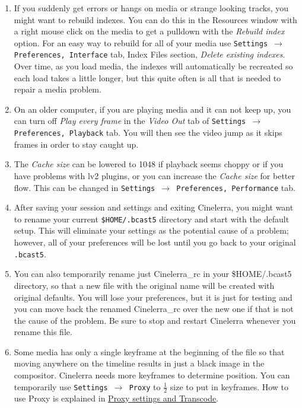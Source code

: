 \begin{enumerate}
	\item If you suddenly get errors or hangs on media or strange looking tracks, you might want to rebuild indexes. You can do this in the Resources window with a right mouse click on the media to get a pulldown with the \textit{Rebuild index} option. For an easy way to rebuild for all of your media use \texttt{Settings $\rightarrow$ Preferences, Interface} tab, Index Files section, \textit{Delete existing indexes}. Over time, as you
load media, the indexes will automatically be recreated so each load takes a little longer, but this quite often
is all that is needed to repair a media problem.
	\item On an older computer, if you are playing media and it can not keep up, you can turn off \textit{Play every frame} in the \textit{Video Out} tab of \texttt{Settings $\rightarrow$ Preferences, Playback} tab. You will then see the video jump as it skips frames in order to stay caught up.
	\item The \textit{Cache size} can be lowered to 1048 if playback seems choppy or if you have problems with lv2 plugins, or you can increase the \textit{Cache size} for better flow. This can be changed in \texttt{Settings $\rightarrow$ Preferences, Performance} tab.
	\item After saving your session and settings and exiting Cinelerra, you might want to rename your current \texttt{\$HOME/.bcast5} directory and start with the default setup. This will eliminate your settings as the potential cause of a problem; however, all of your preferences will be lost until you go back to your original \texttt{.bcast5}.
        \item You can also temporarily rename just Cinelerra\_rc in your \$HOME/.bcast5 directory, so
that a new file with the original name will be created with original defaults.  You will lose your preferences,
but it is just for testing and you can move back the renamed Cinelerra\_rc over the new one if that is not the
cause of the problem.  Be sure to stop and restart Cinelerra whenever you rename this file.
	\item Some media has only a single keyframe at the beginning of the file so that moving anywhere on the timeline results in just a black image in the compositor. Cinelerra needs more keyframes to determine position. You can temporarily use \texttt{Settings $\rightarrow$ Proxy} to $\frac{1}{2}$ size to put in keyframes. How to use Proxy is explained in \href{sec:proxy_settings}{Proxy settings and Transcode}.

\end{enumerate}
